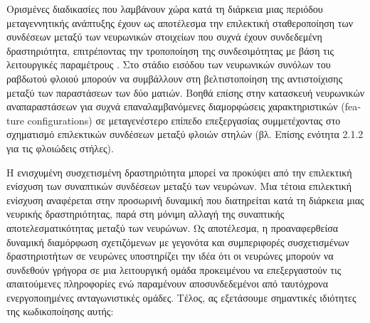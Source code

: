 \documentclass[12pt]{report}
\begin{document}
Ορισμένες διαδικασίες που λαμβάνουν χώρα κατά τη διάρκεια μιας περιόδου μεταγεννητικής ανάπτυξης έχουν ως αποτέλεσμα την επιλεκτική σταθεροποίηση των συνδέσεων μεταξύ των νευρωνικών στοιχείων που συχνά έχουν συνδεδεμένη δραστηριότητα, επιτρέποντας την τροποποίηση της συνδεσιμότητας με βάση τις λειτουργικές παραμέτρους \cite{singer1998}. Στο στάδιο εισόδου των νευρωνικών συνόλων του ραβδωτού φλοιού μπορούν να συμβάλλουν στη βελτιστοποίηση της αντιστοίχισης μεταξύ των παραστάσεων των δύο ματιών. Βοηθά επίσης στην κατασκευή νευρωνικών αναπαραστάσεων για συχνά επαναλαμβανόμενες διαμορφώσεις χαρακτηριστικών (\textlatin{feature configurations}) σε μεταγενέστερο επίπεδο επεξεργασίας συμμετέχοντας στο σχηματισμό επιλεκτικών συνδέσεων μεταξύ φλοιών στηλών (βλ. Επίσης ενότητα 2.1.2 για τις φλοιώδεις στήλες).

Η ενισχυμένη συσχετισμένη δραστηριότητα μπορεί να προκύψει από την επιλεκτική ενίσχυση των συναπτικών συνδέσεων μεταξύ των νευρώνων. Μια τέτοια επιλεκτική ενίσχυση αναφέρεται στην προσωρινή δυναμική που διατηρείται κατά τη διάρκεια μιας νευρικής δραστηριότητας, παρά στη μόνιμη αλλαγή της συναπτικής αποτελεσματικότητας μεταξύ των νευρώνων. Ως αποτέλεσμα, η προαναφερθείσα δυναμική διαμόρφωση σχετιζόμενων με γεγονότα και συμπεριφορές συσχετισμένων δραστηριοτήτων σε νευρώνες υποστηρίζει την ιδέα ότι οι νευρώνες μπορούν να συνδεθούν γρήγορα σε μια λειτουργική ομάδα προκειμένου να επεξεργαστούν τις απαιτούμενες πληροφορίες ενώ παραμένουν αποσυνδεδεμένοι από ταυτόχρονα ενεργοποιημένες ανταγωνιστικές ομάδες. Τέλος, ας εξετάσουμε σημαντικές ιδιότητες της κωδικοποίησης αυτής:
\end{document}
